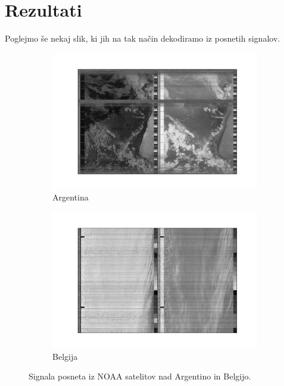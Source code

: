\documentclass{article}
\begin{document}
\section{Rezultati}
Poglejmo še nekaj slik, ki jih na tak način dekodiramo iz posnetih signalov. 
\begin{figure}[H]
    \centering
    \begin{subfigure}[b]{0.49\textwidth}
        \centering
        \includegraphics[width=\textwidth]{argentina.pdf}
        \caption{Argentina}
    \end{subfigure}
    \hfill
    \begin{subfigure}[b]{0.49\textwidth}
        \centering
        \includegraphics[width=\textwidth]{belgium.pdf}
        \caption{Belgija}
    \end{subfigure}

	\caption{Signala posneta iz NOAA satelitov nad Argentino in Belgijo.}
    \label{fig:out_example}
\end{figure}
\end{document}
